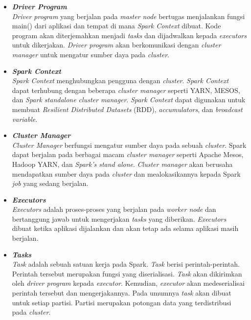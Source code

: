\begin{itemize} 

\item \textbf{\textit{Driver Program}}\\
\textit{Driver program} yang berjalan pada \textit{master node} bertugas menjalankan fungsi main() dari aplikasi dan tempat di mana \textit{Spark Context} dibuat. Kode program akan diterjemahkan menjadi \textit{tasks} dan dijadwalkan kepada \textit{executors} untuk dikerjakan. \textit{Driver program} akan berkomunikasi dengan \textit{cluster manager} untuk mengatur sumber daya pada \textit{cluster}.\\

\item \textbf{\textit{Spark Context}}\\
\textit{Spark Context} menghubungkan pengguna dengan \textit{cluster}. \textit{Spark Context} dapat terhubung dengan beberapa \textit{cluster manager} seperti YARN, MESOS, dan \textit{Spark standalone cluster manager}. \textit{Spark Context} dapat digunakan untuk membuat \textit{Resilient Distributed Datasets} (RDD), \textit{accumulators}, dan \textit{broadcast variable}. 

\item \textbf{\textit{Cluster Manager}}\\
\textit{Cluster Manager} berfungsi mengatur sumber daya pada sebuah \textit{cluster}. Spark dapat berjalan pada berbagai macam \textit{cluster manager} seperti Apache Mesos, Hadoop YARN, dan \textit{Spark's stand alone}. \textit{Cluster manager} akan berusaha mendapatkan sumber daya pada \textit{cluster} dan mealokasikannya kepada Spark \textit{job} yang sedang berjalan.

\item \textbf{\textit{Executors}}\\
\textit{Executors} adalah proses-proses yang berjalan pada \textit{worker node} dan bertanggung jawab untuk mengerjakan \textit{tasks} yang diberikan. \textit{Executors} dibuat ketika aplikasi dijalankan dan akan tetap ada selama aplikasi masih berjalan.

\item \textbf{\textit{Tasks}}\\
\textit{Task} adalah sebuah satuan kerja pada Spark. \textit{Task} berisi perintah-perintah. Perintah tersebut merupakan fungsi yang diserialisasi. \textit{Task} akan dikirimkan oleh \textit{driver program} kepada \textit{executor}. Kemudian, \textit{executor} akan medeserialisai perintah tersebut dan mengerjakannya. Pada umumnya \textit{task} akan dibuat untuk setiap partisi. Partisi merupakan potongan data yang terdistribusi pada \textit{cluster}.


\end{itemize}







